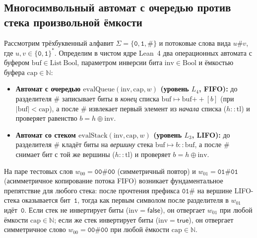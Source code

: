 \documentclass[11pt,a4paper]{article}
\theoremstyle{cleanthm}
\theoremstyle{cleandef}
\begin{document}
\subsection{Многосимвольный автомат с очередью против стека произвольной ёмкости}

Рассмотрим трёхбуквенный алфавит $\Sigma=\{\mathtt{0},\mathtt{1},\mathtt{\#}\}$ и потоковые слова вида $u\mathtt{\#}v$, где $u,v\in\{\mathtt{0},\mathtt{1}\}^*$. Определим в чистом ядре Lean~4 два операционных автомата с буфером $\mathrm{buf}\in\mathrm{List\ Bool}$, параметром инверсии бита $\mathrm{inv}\in\mathrm{Bool}$ и ёмкостью буфера $\mathrm{cap}\in\mathbb{N}$:
\begin{itemize}
  \item \textbf{Автомат с очередью $\mathrm{evalQueue}(\mathrm{inv},\mathrm{cap},w)$ (уровень $L_4$, FIFO):} до разделителя $\mathtt{\#}$ записывает биты в \emph{конец} списка $\mathrm{buf}\mapsto\mathrm{buf}\mathbin{+\!+}[b]$ (при $|\mathrm{buf}|<\mathrm{cap}$), а после $\mathtt{\#}$ извлекает первый элемент из \emph{начала} списка ($h::\mathrm{tl}$) и проверяет равенство $b = h \oplus \mathrm{inv}$.
  \item \textbf{Автомат со стеком $\mathrm{evalStack}(\mathrm{inv},\mathrm{cap},w)$ (уровень $L_3$, LIFO):} до разделителя $\mathtt{\#}$ кладёт биты на \emph{вершину} стека $\mathrm{buf}\mapsto b::\mathrm{buf}$, а после $\mathtt{\#}$ снимает бит с той же вершины ($h::\mathrm{tl}$) и проверяет $b = h \oplus \mathrm{inv}$.
\end{itemize}

На паре тестовых слов $w_{00}=\mathtt{00\#00}$ (симметричный повтор) и $w_{01}=\mathtt{01\#01}$ (асимметричное копирование потока FIFO) возникает фундаментальное препятствие для любого стека: после прочтения префикса $\mathtt{01\#}$ на вершине LIFO-стека оказывается бит~$\mathtt{1}$, тогда как первым символом после разделителя в $w_{01}$ идёт~$\mathtt{0}$. Если стек не инвертирует биты ($\mathrm{inv}=\mathsf{false}$), он отвергает $w_{01}$ при любой ёмкости $\mathrm{cap}\in\mathbb{N}$; если же стек инвертирует биты ($\mathrm{inv}=\mathsf{true}$), он отвергает симметричное слово $w_{00}=\mathtt{00\#00}$ при любой ёмкости $\mathrm{cap}\in\mathbb{N}$.
\end{document}
